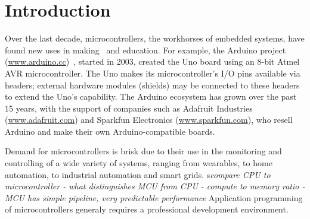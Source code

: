 \section{Introduction}
\label{sec:intro}

Over the last decade, microcontrollers, the workhorses of embedded systems, have found
new uses in making~\cite{dougherty2012maker} and education. For example, the Arduino project
(\url{www.arduino.cc})~\cite{buildingArduino2014},
started in 2003, created the Uno board using an 8-bit Atmel
AVR microcontroller. The Uno makes its microcontroller's I/O pins available via headers;
external hardware modules (shields) may be connected to these headers to extend
the Uno's capability. The Arduino ecosystem has grown over the past 15 years,
with the support of companies such as Adafruit Industries (\url{www.adafruit.com}) and
Sparkfun Electronics (\url{www.sparkfun.com}), who resell Arduino and make their
own Arduino-compatible boards.

Demand for microcontrollers is brisk due to their use in the monitoring and controlling
of a wide variety of systems, ranging from wearables, to home automation, to industrial 
automation and smart grids. s\emph{compare CPU to microcontroller - what distinguishes MCU from CPU - 
compute to memory ratio - MCU has simple pipeline, very predictable performance}
Application programming of microcontrollers generaly requires a professional
development environment. 





